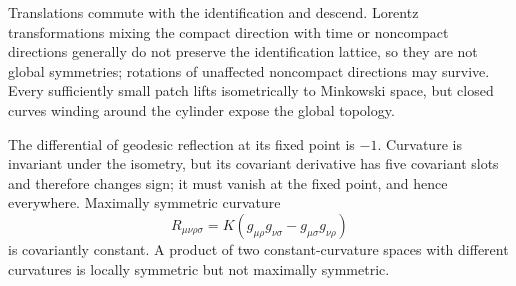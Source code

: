 \begin{solution}
Translations commute with the identification and descend.  Lorentz
transformations mixing the compact direction with time or noncompact
directions generally do not preserve the identification lattice, so they are
not global symmetries; rotations of unaffected noncompact directions may
survive.  Every sufficiently small patch lifts isometrically to Minkowski
space, but closed curves winding around the cylinder expose the global
topology.
\end{solution}

\begin{solution}
The differential of geodesic reflection at its fixed point is \(-1\).
Curvature is invariant under the isometry, but its covariant derivative has
five covariant slots and therefore changes sign; it must vanish at the fixed
point, and hence everywhere.  Maximally symmetric curvature
\[
R_{\mu\nu\rho\sigma}
=K(g_{\mu\rho}g_{\nu\sigma}-g_{\mu\sigma}g_{\nu\rho})
\]
is covariantly constant.  A product of two constant-curvature spaces with
different curvatures is locally symmetric but not maximally symmetric.
\end{solution}
